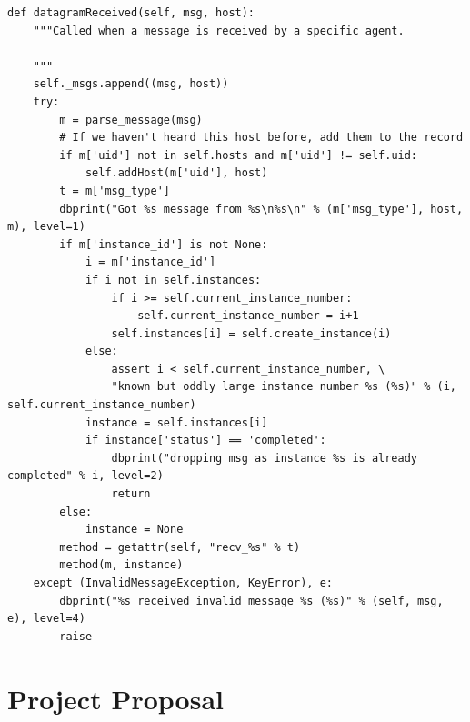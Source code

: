 \documentclass[12pt,twoside,notitlepage]{report}
\begin{document}
\begin{lstlisting}
def datagramReceived(self, msg, host):
    """Called when a message is received by a specific agent.

    """
    self._msgs.append((msg, host))
    try:
        m = parse_message(msg)
        # If we haven't heard this host before, add them to the record
        if m['uid'] not in self.hosts and m['uid'] != self.uid:
            self.addHost(m['uid'], host)
        t = m['msg_type']
        dbprint("Got %s message from %s\n%s\n" % (m['msg_type'], host, m), level=1)
        if m['instance_id'] is not None:
            i = m['instance_id']
            if i not in self.instances:
                if i >= self.current_instance_number:
                    self.current_instance_number = i+1
                self.instances[i] = self.create_instance(i)
            else:
                assert i < self.current_instance_number, \
                "known but oddly large instance number %s (%s)" % (i, self.current_instance_number)
            instance = self.instances[i]
            if instance['status'] == 'completed':
                dbprint("dropping msg as instance %s is already completed" % i, level=2)
                return
        else:
            instance = None
        method = getattr(self, "recv_%s" % t)
        method(m, instance)
    except (InvalidMessageException, KeyError), e:
        dbprint("%s received invalid message %s (%s)" % (self, msg, e), level=4)
        raise
\end{lstlisting}

\chapter{Project Proposal}


\end{document}
